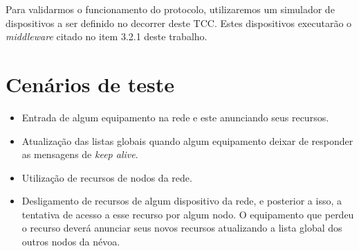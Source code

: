 Para validarmos o funcionamento do protocolo, utilizaremos um simulador de dispositivos a ser definido no decorrer deste TCC.
Estes dispositivos executarão o \textit{middleware} citado no item 3.2.1 deste trabalho.

\section{Cenários de teste}

\begin{itemize}
    \item Entrada de algum equipamento na rede e este anunciando seus recursos. 
    \item Atualização das listas globais quando algum equipamento deixar de responder as mensagens de \textit{keep alive}.
    \item Utilização de recursos de nodos da rede.
    \item Desligamento de recursos de algum dispositivo da rede, e posterior a isso, a tentativa de acesso a esse recurso por algum nodo.
    O equipamento que perdeu o recurso deverá anunciar seus novos recursos atualizando a lista global dos outros nodos da névoa.
\end{itemize}










